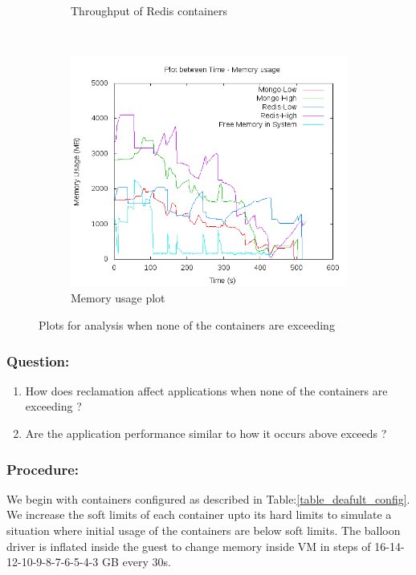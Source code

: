 \begin{figure}[t!]
\begin{subfigure}[t]{0.48\textwidth}
	    \caption{Throughput of Redis containers}
	    \label{plot_inference_below_sl_redis}
	  \end{subfigure}
	  ~ 
	  \begin{subfigure}[t]{0.48\textwidth}
	    \centering
	    \includegraphics[width=1\textwidth]{images/inference/below_sl.png}
	    \caption{Memory usage plot}
	    \label{plot_inference_below_sl}
	  \end{subfigure}
	  \caption{Plots for analysis when none of the containers are exceeding}
	\end{figure}
	
	\subsubsection{Question:}
	  \begin{enumerate}	    
	    \item How does reclamation affect applications when none of the containers are exceeding ?
	    \item Are the application performance similar to how it occurs above exceeds ?
	  \end{enumerate}	
	
	\subsubsection{Procedure:}
	  We begin with containers configured as described in Table:\ref{table_deafult_config}. We increase the soft limits of each 
container upto its hard limits to simulate a situation where initial usage of the containers are below soft limits. The balloon driver is 
inflated inside the guest to change memory inside VM in steps of 16-14-12-10-9-8-7-6-5-4-3 GB every 30s. 
	
